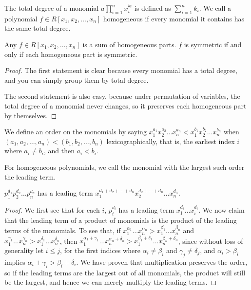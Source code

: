 \begin{definition}
    The total degree of a monomial \(a\prod_{i=1}^n x_i^{k_i}\)
    is defined as \(\sum_{i=1}^n k_i\).
    We call a polynomial \(f \in R[x_1,x_2,\hdots,x_n]\) homogeneous
    if every monomial it contains has the same total degree.
\end{definition}
\begin{lemma}\label{lem:homogeneous-sym-polynomial}
    Any \(f \in R[x_1,x_2,\hdots,x_n]\) is a sum of homogeneous parts.
    \(f\) is symmetric if and only if each homogeneous part is symmetric.
\end{lemma}
\begin{proof}
    The first statement is clear
    because every monomial has a total degree,
    and you can simply group them by total degree.

    The second statement is also easy,
    because under permutation of variables,
    the total degree of a monomial never changes,
    so it preserves each homogeneous part by themselves.
\end{proof}

\begin{definition}
    We define an order on the monomials
    by saying \(x_1^{a_1}x_2^{a_2} \hdots x_n^{a_n}
    < x_1^{b_1}x_2^{b_2} \hdots x_n^{b_n}\)
    when \((a_1,a_2,\hdots,a_n) < (b_1,b_2,\hdots,b_n)\) lexicographically,
    that is, the earliest index \(i\) where \(a_i \neq b_i\),
    and then \(a_i < b_i\).
\end{definition}
\begin{definition}
    For homogeneous polynomials,
    we call the monomial with the largest such order
    the leading term.
\end{definition}

\begin{lemma}\label{lem:leading-term-sym-polynomial}
    \(p_1^{d_1}p_2^{d_2} \hdots p_n^{d_n}\) has a leading term
    \(x_1^{d_1+d_2+\cdots+d_n}x_2^{d_2+\cdots+d_n} \hdots x_n^{d_n}\).
\end{lemma}
\begin{proof}
    We first see that for each \(i\),
    \(p_i^{d_i}\) has a leading term \(x_1^{d_i} \hdots x_i^{d_i}\).
    We now claim that the leading term of a product of monomials
    is the product of the leading terms of the monomials.
    To see that, if \(x_1^{\alpha_1} \hdots x_n^{\alpha_n}
    > x_1^{\beta_1} \hdots x_n^{\beta_n}\)
    and \(x_1^{\gamma_1} \hdots x_n^{\gamma_n}
    > x_1^{\delta_1} \hdots x_n^{\delta_n}\),
    then \(x_1^{\alpha_1+\gamma_1} \hdots x_n^{\alpha_n+\delta_n}
    > x_1^{\beta_1+\delta_1} \hdots x_n^{\beta_n+\delta_n}\),
    since without loss of generality let \(i \leq j\),
    for the first indices where
    \(\alpha_i \neq \beta_i\) and \(\gamma_j \neq \delta_j\),
    and \(\alpha_i > \beta_i\) implies \(\alpha_i+\gamma_i > \beta_i+\delta_i\).
    We have proven that multiplication preserves the order,
    so if the leading terms are the largest out of all monomials,
    the product will still be the largest,
    and hence we can merely multiply the leading terms.
\end{proof}

